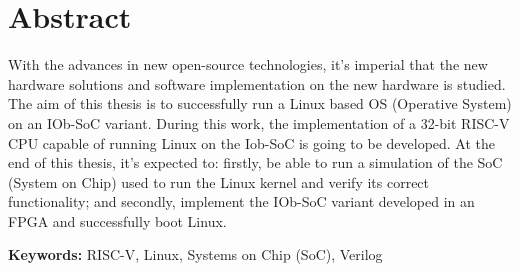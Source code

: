 
\section*{Abstract}



\quad With the advances in new open-source technologies, it's imperial that the new hardware solutions and software implementation on the new hardware is studied. The aim of this thesis is to successfully run a Linux based OS (Operative System) on an IOb-SoC variant. During this work, the implementation of a 32-bit RISC-V CPU capable of running Linux on the Iob-SoC is going to be developed. At the end of this thesis, it's expected to: firstly, be able to run a simulation of the SoC (System on Chip) used to run the Linux kernel and verify its correct functionality; and secondly, implement the IOb-SoC variant developed in an FPGA and successfully boot Linux.

\vfill

\textbf{\Large Keywords:} RISC-V, Linux,
Systems on Chip (SoC), Verilog
